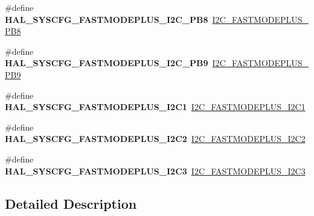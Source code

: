 \begin{DoxyCompactItemize}
\item 
\mbox{\label{group___h_a_l___s_y_s_c_f_g___aliased___defines_gad8342aebd8090a8777d84165d5726b62}} 
\#define {\bfseries H\+A\+L\+\_\+\+S\+Y\+S\+C\+F\+G\+\_\+\+F\+A\+S\+T\+M\+O\+D\+E\+P\+L\+U\+S\+\_\+\+I2\+C\+\_\+\+P\+B8}~\mbox{\hyperlink{group___i2_c_ex___fast_mode_plus_gaf8d6aa219f041b552b3d3cd53cb78a26}{I2\+C\+\_\+\+F\+A\+S\+T\+M\+O\+D\+E\+P\+L\+U\+S\+\_\+\+P\+B8}}
\item 
\mbox{\label{group___h_a_l___s_y_s_c_f_g___aliased___defines_ga8ace04770933b1fbf1b0e28abd6f3a25}} 
\#define {\bfseries H\+A\+L\+\_\+\+S\+Y\+S\+C\+F\+G\+\_\+\+F\+A\+S\+T\+M\+O\+D\+E\+P\+L\+U\+S\+\_\+\+I2\+C\+\_\+\+P\+B9}~\mbox{\hyperlink{group___i2_c_ex___fast_mode_plus_gafab6e63d100bf337bf9f0bf6a607636d}{I2\+C\+\_\+\+F\+A\+S\+T\+M\+O\+D\+E\+P\+L\+U\+S\+\_\+\+P\+B9}}
\item 
\mbox{\label{group___h_a_l___s_y_s_c_f_g___aliased___defines_gad982b1937d6178bc74b6f95e3d343ab1}} 
\#define {\bfseries H\+A\+L\+\_\+\+S\+Y\+S\+C\+F\+G\+\_\+\+F\+A\+S\+T\+M\+O\+D\+E\+P\+L\+U\+S\+\_\+\+I2\+C1}~\mbox{\hyperlink{group___i2_c_ex___fast_mode_plus_ga3a8064ecfa3b33115f62123f7162770e}{I2\+C\+\_\+\+F\+A\+S\+T\+M\+O\+D\+E\+P\+L\+U\+S\+\_\+\+I2\+C1}}
\item 
\mbox{\label{group___h_a_l___s_y_s_c_f_g___aliased___defines_gaa415be62939648ababfdce87dea7c8d4}} 
\#define {\bfseries H\+A\+L\+\_\+\+S\+Y\+S\+C\+F\+G\+\_\+\+F\+A\+S\+T\+M\+O\+D\+E\+P\+L\+U\+S\+\_\+\+I2\+C2}~\mbox{\hyperlink{group___i2_c_ex___fast_mode_plus_gaa5c33513afa036a6f97e9cbf2d61f4b2}{I2\+C\+\_\+\+F\+A\+S\+T\+M\+O\+D\+E\+P\+L\+U\+S\+\_\+\+I2\+C2}}
\item 
\mbox{\label{group___h_a_l___s_y_s_c_f_g___aliased___defines_ga3347764cd910d40c261ffcfa150b0912}} 
\#define {\bfseries H\+A\+L\+\_\+\+S\+Y\+S\+C\+F\+G\+\_\+\+F\+A\+S\+T\+M\+O\+D\+E\+P\+L\+U\+S\+\_\+\+I2\+C3}~\mbox{\hyperlink{group___i2_c_ex___fast_mode_plus_gafeb5c46154f31ecf6ff77d4ab1d2ee7b}{I2\+C\+\_\+\+F\+A\+S\+T\+M\+O\+D\+E\+P\+L\+U\+S\+\_\+\+I2\+C3}}
\end{DoxyCompactItemize}


\subsection{Detailed Description}
